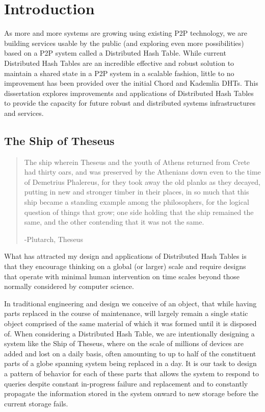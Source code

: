 





\chapter{Introduction}

As more and more systems are growing using existing P2P technology, we are building services usable by the public (and exploring even more possibilities) based on a P2P system called a Distributed Hash Table.
While current Distributed Hash Tables are an incredible effective and robust solution to maintain a shared state in a P2P system in a scalable fashion, little to no improvement has been provided over the initial Chord\cite{chord} and Kademlia\cite{kademlia} DHTs.
This dissertation explores improvements and applications of Distributed Hash Tables to provide the capacity for future robust and distributed systems infrastructures and services.

\section{The Ship of Theseus}

\singlespacing
\blockquote{The ship wherein Theseus and the youth of Athens returned from Crete had thirty oars, and was preserved by the Athenians down even to the time of Demetrius Phalereus, for they took away the old planks as they decayed, putting in new and stronger timber in their places, in so much that this ship became a standing example among the philosophers, for the logical question of things that grow; one side holding that the ship remained the same, and the other contending that it was not the same.

-Plutarch, Theseus

}
\doublespacing

What has attracted my design and applications of Distributed Hash Tables is that they encourage thinking on a global (or larger) scale and require designs that operate with minimal human intervention on time scales beyond those normally considered by computer science.

In traditional engineering and design we conceive of an object, that while having parts replaced in the course of maintenance, will largely remain a single static object comprised of the same material of which it was formed until it is disposed of.
When considering a Distributed Hash Table, we are intentionally designing a system like the Ship of Theseus, where on the scale of millions of devices are added and lost on a daily basis, often amounting to up to half of the constituent parts of a globe spanning system being replaced in a day.
It is our task to design a pattern of behavior for each of these parts that allows the system to respond to queries despite constant in-progress failure and replacement and to constantly propagate the information stored in the system onward to new storage before the current storage fails. 

